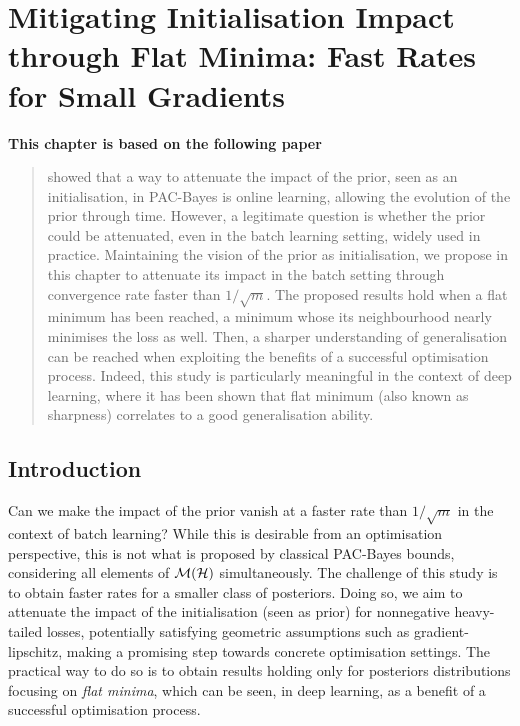 \chapter[Mitigating Initialisation Impact through Flat Minima: Fast Rates for Small Gradients]{Mitigating Initialisation Impact through Flat Minima: Fast Rates for Small Gradients}
\label{chap:gen-flat-minima}
\addchapterlof
\addchapterloa
\addchapterloe
 
\vspace{-2.0cm}
\begin{center}
\textbf{This chapter is based on the following paper}\\[-0.1cm]
\end{center}


\vspace{0.2cm}
\minitoc

\begin{abstract}
\vspace{-0.2cm}
 showed that a way to attenuate the impact of the prior, seen as an initialisation, in PAC-Bayes is online learning, allowing the evolution of the prior through time. However, a legitimate question is whether the prior could be attenuated, even in the batch learning setting, widely used in practice. Maintaining the vision of the prior as initialisation, we propose in this chapter to attenuate its impact in the batch setting through convergence rate faster than $1/\sqrt{m}$. The proposed results hold when a flat minimum has been reached, \ie a minimum whose its neighbourhood nearly minimises the loss as well. Then, a sharper understanding of generalisation can be reached when exploiting the benefits of a successful optimisation process. Indeed, this study is particularly meaningful in the context of deep learning, where it has been shown that flat minimum (also known as sharpness) correlates to a good generalisation ability.  
\end{abstract}

\newpage

\section{Introduction}

Can we make the impact of the prior vanish at a faster rate than $1/\sqrt{m}$ in the context of batch learning? While this is desirable from an optimisation perspective, this is not what is proposed by classical PAC-Bayes bounds, considering all elements of $\mathcal{M}(\mathcal{H})$ simultaneously. The challenge of this study is to obtain faster rates for a smaller class of posteriors. Doing so, we aim to attenuate the impact of the initialisation (seen as prior) for nonnegative heavy-tailed losses, potentially satisfying geometric assumptions such as gradient-lipschitz, making a promising step towards concrete optimisation settings. The practical way to do so is to obtain results holding only for posteriors distributions focusing on \emph{flat minima}, which can be seen, \eg in deep learning, as a benefit of a successful optimisation process.


